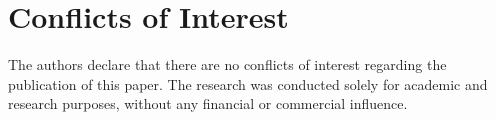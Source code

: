 \section*{Conflicts of Interest}

   The authors declare that there are no conflicts of interest regarding the publication of this paper. The research was conducted solely for academic and research purposes, without any financial or commercial influence.
